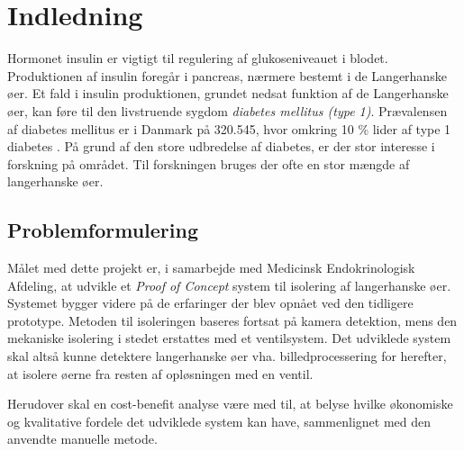 \chapter{Indledning}
Hormonet insulin er vigtigt til regulering af glukoseniveauet i blodet. Produktionen af insulin foregår i pancreas, nærmere bestemt i de Langerhanske øer. Et fald i insulin produktionen, grundet nedsat funktion af de Langerhanske øer, kan føre til den livstruende sygdom \textit{diabetes mellitus (type 1)}. Prævalensen af diabetes mellitus er i Danmark på 320.545, hvor omkring 10 \% lider af type 1 diabetes \citep{diabetes}. På grund af den store udbredelse af diabetes, er der stor interesse i forskning på området. Til forskningen bruges der ofte en stor mængde af langerhanske øer. 





\section{Problemformulering}

Målet med dette projekt er, i samarbejde med Medicinsk Endokrinologisk Afdeling, at udvikle et \textit{Proof of Concept} system til isolering af langerhanske øer. Systemet bygger videre på de erfaringer der blev opnået ved den tidligere prototype. Metoden til isoleringen baseres fortsat på kamera detektion, mens den mekaniske isolering i stedet erstattes med et ventilsystem. Det udviklede system skal altså kunne detektere langerhanske øer vha. billedprocessering for herefter, at isolere øerne fra resten af opløsningen med en ventil. 

Herudover skal en cost-benefit analyse være med til, at belyse hvilke økonomiske og kvalitative fordele det udviklede system kan have, sammenlignet med den anvendte manuelle metode.

